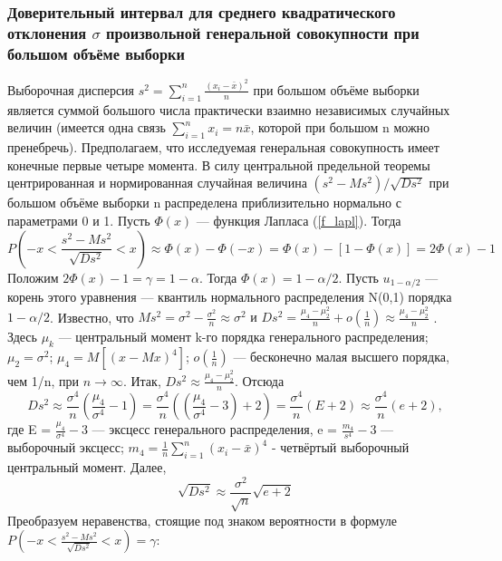 \documentclass[a4paper]{article}
\begin{document}
    \subsubsection{Доверительный интервал для среднего квадратического отклонения $\sigma$ произвольной генеральной совокупности при большом объёме выборки}
    Выборочная дисперсия $s^{2} = \sum_{i = 1}^{n}{\frac{(x_{i} - \bar{x})^{2}}{n}}$ при большом объёме выборки является суммой большого числа практически взаимно независимых случайных величин (имеется одна связь $\sum_{i=1}^{n}{x_{i}} = n\bar{x}$, которой при большом n можно пренебречь). Предполагаем, что исследуемая генеральная совокупность имеет конечные первые четыре момента.
    \newline
    В силу центральной предельной теоремы центрированная и нормированная случайная величина $(s^{2}-Ms^{2})/\sqrt{D s^{2}}$ при большом объёме выборки n распределена приблизительно нормально с параметрами 0 и 1. Пусть $\Phi(x)$ — функция Лапласа (\ref{f_lapl}). Тогда
    $$
        P\left(-x < \frac{s^{2}-Ms^{2}}{\sqrt{D s^{2}}} < x\right)
        \approx \Phi(x) - \Phi(-x)=\Phi(x) - [1 - \Phi(x)] = 2\Phi(x) - 1
        \label{P_as_sigma}
    $$
    Положим $2\Phi(x)-1 = \gamma = 1-\alpha$. Тогда $\Phi(x) = 1-\alpha/2$. Пусть $u_{1-\alpha/2}$ — корень этого уравнения — квантиль нормального распределения N(0,1) порядка $1-\alpha/2$. Известно, что $Ms^{2} = \sigma^{2} -\frac{\sigma^{2}}{n} \approx \sigma^{2} \text{ и } D s^{2} = \frac{\mu_{4} -\mu_{2}^{2}}{n} + o(\frac{1}{n}) \approx \frac{\mu_{4} -\mu_{2}^{2}}{n}$ . Здесь $\mu_{k}$ — центральный момент k-го порядка генерального распределения; $\mu_{2} = \sigma^{2}$; $\mu_{4} = M[(x-M x)^{4}]$︀; $o(\frac{1}{n})$ — бесконечно малая высшего порядка, чем 1/n, при $n\rightarrow \infty$. Итак, $D s^{2} \approx \frac{\mu_{4} -\mu_{2}^{2}}{n}$. Отсюда
   $$
        D s^{2} \approx \frac{\sigma^{4}}{n}(\frac{\mu_{4}}{\sigma^{4}} - 1) = 
        \frac{\sigma^{4}}{n}((\frac{\mu_{4}}{\sigma^{4}} - 3) + 2) = \frac{\sigma^{4}}{n}(E + 2) \approx \frac{\sigma^{4}}{n}(e + 2),
        \label{Ds_2}
    $$
    где E = $\frac{\mu_{4}}{\sigma^{4}} - 3$ — эксцесс генерального распределения, e = $\frac{m_{4}}{s^{4}} - 3$ — выборочный эксцесс; $m_{4} = \frac{1}{n}\sum_{i =1}^{n}{(x_{i} - \bar{x})^{4}}$  - четвёртый выборочный центральный момент. Далее,
    $$
        \sqrt{D s^{2}} \approx \frac{\sigma^{2}}{\sqrt{n}}\sqrt{e + 2}
        \label{sqrt_Ds}
    $$
    Преобразуем неравенства, стоящие под знаком вероятности в формуле
    \newline
    $P\left(-x < \frac{s^{2}-Ms^{2}}{\sqrt{D s^{2}}} < x\right) = \gamma$:
\end{document}
